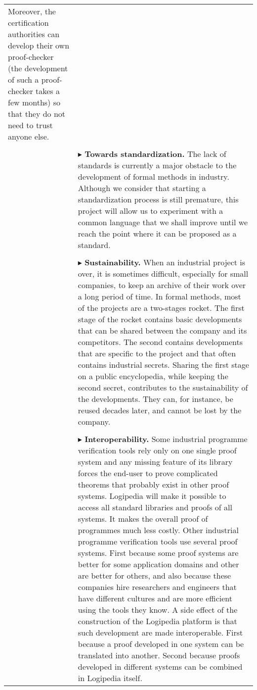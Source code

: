 \begin{longtable}{|p{}|p{}|}
Moreover, the certification authorities can develop their own
proof-checker (the development of such a proof-checker takes a few
months) so that they do not need to trust anyone else.\\
&\\
&
$\blacktriangleright$ 
{\bf Towards standardization.}
The lack of standards is currently a major obstacle to the development
of formal methods in industry. Although we consider that starting a
standardization process is still premature, this project will allow us
to experiment with a common language that we shall improve until we
reach the point where it can be proposed as a standard.\\
&\\
&
$\blacktriangleright$ 
{\bf Sustainability.}
When an industrial project is over, it is sometimes difficult,
especially for small companies, to keep an archive of their work over
a long period of time. In formal methods, most of the projects are a
two-stages rocket. The first stage of the rocket contains basic
developments that can be shared between the company and its
competitors. The second contains developments that are specific to the
project and that often contains industrial secrets.
Sharing the first stage on a public encyclopedia, while keeping the
second secret, contributes to the sustainability of the
developments. They can, for instance, be reused decades later, and
cannot be lost by the company.\\
&\\
&
$\blacktriangleright$ 
{\bf Interoperability.}
  Some industrial programme verification tools rely only on one single
  proof system and any missing feature of its library forces the
  end-user to prove complicated theorems that probably exist in other
  proof systems. Logipedia will make it possible to access all
  standard libraries and proofs of all systems. It makes the overall
  proof of programmes much less costly.
  Other industrial programme verification tools use several proof
  systems. First because some proof systems are better for some
  application domains and other are better for others, and also
  because these companies hire researchers and engineers that have
  different cultures and are more efficient using the tools they know.
  A side effect of the construction of the Logipedia platform is that
  such development are made interoperable. First because a proof
  developed in one system can be translated into another. Second
  because proofs developed in different systems can be combined in
  Logipedia itself.\\

\end{longtable}
